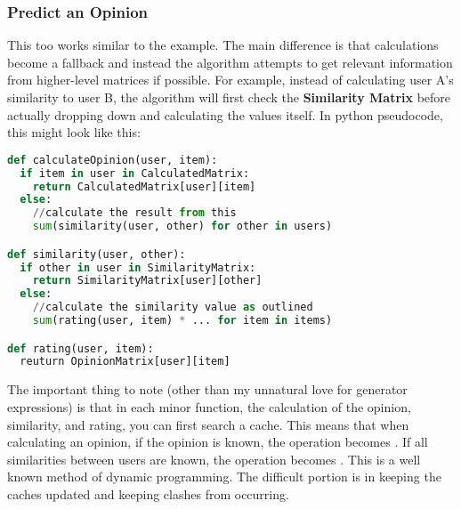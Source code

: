 \documentclass[12pt]{article}
\begin{document}
  \subsubsection{Predict an Opinion}
  \indent\indent This too works similar to the example.  The main difference is that calculations become a fallback and instead the algorithm attempts to get relevant information from higher-level matrices if possible.  For example, instead of calculating user A's similarity to user B, the algorithm will first check the \textbf{Similarity Matrix} before actually dropping down and calculating the values itself.  In python pseudocode, this might look like this:
  \begin{lstlisting}[language=python]
def calculateOpinion(user, item):
  if item in user in CalculatedMatrix:
    return CalculatedMatrix[user][item]
  else:
    //calculate the result from this
    sum(similarity(user, other) for other in users)

def similarity(user, other):
  if other in user in SimilarityMatrix:
    return SimilarityMatrix[user][other]
  else:
    //calculate the similarity value as outlined
    sum(rating(user, item) * ... for item in items)

def rating(user, item):
  reuturn OpinionMatrix[user][item]
  \end{lstlisting}
  \indent The important thing to note (other than my unnatural love for generator expressions) is that in each minor function, the calculation of the opinion, similarity, and rating, you can first search a cache.  This means that when calculating an opinion, if the opinion is known, the operation becomes .  If all similarities between users are known, the operation becomes .  This is a well known method of dynamic programming.  The difficult portion is in keeping the caches updated and keeping clashes from occurring.
\end{document}
